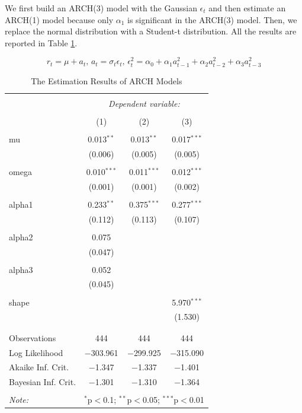\documentclass[a4paper,11pt]{article}\usepackage[]{graphicx}\usepackage[]{color}
\begin{document}
We first build an ARCH(3) model with the Gaussian $\epsilon_t$ and then estimate an ARCH(1) model because only $\alpha_1$ is significant in the ARCH(3) model. Then, we replace the normal distribution with a Student-t distribution. All the results are reported in Table \ref{tab:arch-results}. 

\begin{equation}
r_t = \mu + a_t,\, 
a_t = \sigma_t \epsilon_t,\, 
\epsilon^2_{t}=\alpha_0 + \alpha_1 a^2_{t-1} + \alpha_2 a^2_{t-2} 
+ \alpha_3 a^2_{t-3}
\end{equation}








\begin{table}[!htbp] \centering 
  \caption{The Estimation Results of ARCH Models} 
  \label{tab:arch-results} 
\begin{tabular}{@{\extracolsep{5pt}}lccc} 
\\[-1.8ex]\hline 
\hline \\[-1.8ex] 
 & \multicolumn{3}{c}{\textit{Dependent variable:}} \\ 
\cline{2-4} 
\\[-1.8ex] & (1) & (2) & (3)\\ 
\hline \\[-1.8ex] 
 mu & 0.013$^{**}$ & 0.013$^{**}$ & 0.017$^{***}$ \\ 
  & (0.006) & (0.005) & (0.005) \\ 
  & & & \\ 
 omega & 0.010$^{***}$ & 0.011$^{***}$ & 0.012$^{***}$ \\ 
  & (0.001) & (0.001) & (0.002) \\ 
  & & & \\ 
 alpha1 & 0.233$^{**}$ & 0.375$^{***}$ & 0.277$^{***}$ \\ 
  & (0.112) & (0.113) & (0.107) \\ 
  & & & \\ 
 alpha2 & 0.075 &  &  \\ 
  & (0.047) &  &  \\ 
  & & & \\ 
 alpha3 & 0.052 &  &  \\ 
  & (0.045) &  &  \\ 
  & & & \\ 
 shape &  &  & 5.970$^{***}$ \\ 
  &  &  & (1.530) \\ 
  & & & \\ 
\hline \\[-1.8ex] 
Observations & 444 & 444 & 444 \\ 
Log Likelihood & $-$303.961 & $-$299.925 & $-$315.090 \\ 
Akaike Inf. Crit. & $-$1.347 & $-$1.337 & $-$1.401 \\ 
Bayesian Inf. Crit. & $-$1.301 & $-$1.310 & $-$1.364 \\ 
\hline 
\hline \\[-1.8ex] 
\textit{Note:}  & \multicolumn{3}{r}{$^{*}$p$<$0.1; $^{**}$p$<$0.05; $^{***}$p$<$0.01} \\ 
\end{tabular} 
\end{table} 
\end{document}
